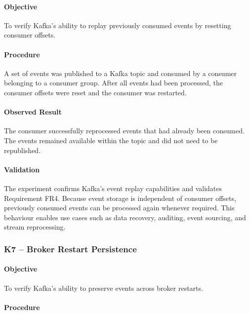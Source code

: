 \documentclass{scrartcl}
\begin{document}
\paragraph{Objective}

To verify Kafka's ability to replay previously consumed events by resetting consumer offsets.

\paragraph{Procedure}

A set of events was published to a Kafka topic and consumed by a consumer belonging to a consumer group. After all events had been processed, the consumer offsets were reset and the consumer was restarted.

\paragraph{Observed Result}

The consumer successfully reprocessed events that had already been consumed. The events remained available within the topic and did not need to be republished.

\paragraph{Validation}

The experiment confirms Kafka's event replay capabilities and validates Requirement FR4. Because event storage is independent of consumer offsets, previously consumed events can be processed again whenever required. This behaviour enables use cases such as data recovery, auditing, event sourcing, and stream reprocessing.

\subsubsection{K7 -- Broker Restart Persistence}

\paragraph{Objective}

To verify Kafka's ability to preserve events across broker restarts.

\paragraph{Procedure}
\end{document}
